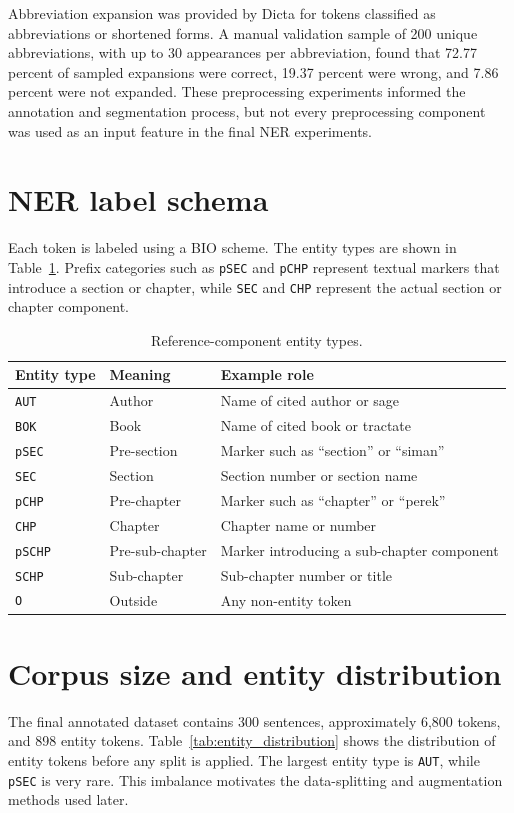 \documentclass[12pt,a4paper]{report}
\begin{document}
Abbreviation expansion was provided by Dicta for tokens classified as abbreviations or shortened forms. A manual validation sample of 200 unique abbreviations, with up to 30 appearances per abbreviation, found that 72.77 percent of sampled expansions were correct, 19.37 percent were wrong, and 7.86 percent were not expanded. These preprocessing experiments informed the annotation and segmentation process, but not every preprocessing component was used as an input feature in the final NER experiments.

\section{NER label schema}
Each token is labeled using a BIO scheme. The entity types are shown in Table~\ref{tab:label_schema}. Prefix categories such as \texttt{pSEC} and \texttt{pCHP} represent textual markers that introduce a section or chapter, while \texttt{SEC} and \texttt{CHP} represent the actual section or chapter component.

\begin{table}[htbp]
\centering
\small
\caption{Reference-component entity types.}
\label{tab:label_schema}
\begin{tabular}{lll}
\toprule
Entity type & Meaning & Example role \\
\midrule
\texttt{AUT} & Author & Name of cited author or sage \\
\texttt{BOK} & Book & Name of cited book or tractate \\
\texttt{pSEC} & Pre-section & Marker such as ``section'' or ``siman'' \\
\texttt{SEC} & Section & Section number or section name \\
\texttt{pCHP} & Pre-chapter & Marker such as ``chapter'' or ``perek'' \\
\texttt{CHP} & Chapter & Chapter name or number \\
\texttt{pSCHP} & Pre-sub-chapter & Marker introducing a sub-chapter component \\
\texttt{SCHP} & Sub-chapter & Sub-chapter number or title \\
\texttt{O} & Outside & Any non-entity token \\
\bottomrule
\end{tabular}
\end{table}

\section{Corpus size and entity distribution}
The final annotated dataset contains 300 sentences, approximately 6,800 tokens, and 898 entity tokens. Table~\ref{tab:entity_distribution} shows the distribution of entity tokens before any split is applied. The largest entity type is \texttt{AUT}, while \texttt{pSEC} is very rare. This imbalance motivates the data-splitting and augmentation methods used later.
\end{document}
